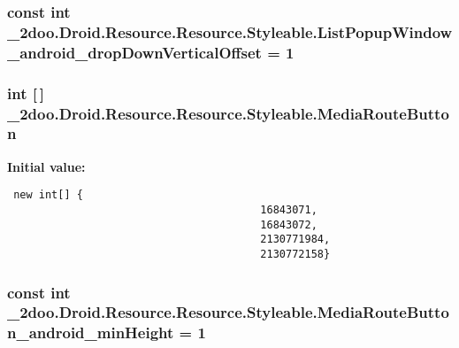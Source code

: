 \hypertarget{class__2doo_1_1_droid_1_1_resource_1_1_styleable_d4f5c7e5aed5b520770e5883af13782b}{
\subsubsection[{ListPopupWindow\_\-android\_\-dropDownVerticalOffset}]{\setlength{\rightskip}{0pt plus 5cm}const int \_\-2doo.Droid.Resource.Resource.Styleable.ListPopupWindow\_\-android\_\-dropDownVerticalOffset = 1}}
\label{class__2doo_1_1_droid_1_1_resource_1_1_styleable_d4f5c7e5aed5b520770e5883af13782b}


\hypertarget{class__2doo_1_1_droid_1_1_resource_1_1_styleable_1a1411bac962b968538047d470349c12}{
\subsubsection[{MediaRouteButton}]{\setlength{\rightskip}{0pt plus 5cm}int \mbox{[}$\,$\mbox{]} \_\-2doo.Droid.Resource.Resource.Styleable.MediaRouteButton}}
\label{class__2doo_1_1_droid_1_1_resource_1_1_styleable_1a1411bac962b968538047d470349c12}


\textbf{Initial value:}

\begin{Code}\begin{verbatim} new int[] {
                                        16843071,
                                        16843072,
                                        2130771984,
                                        2130772158}
\end{verbatim}
\end{Code}
\hypertarget{class__2doo_1_1_droid_1_1_resource_1_1_styleable_b09aeb7ef7634cccfdd60ae029408119}{
\subsubsection[{MediaRouteButton\_\-android\_\-minHeight}]{\setlength{\rightskip}{0pt plus 5cm}const int \_\-2doo.Droid.Resource.Resource.Styleable.MediaRouteButton\_\-android\_\-minHeight = 1}}
\label{class__2doo_1_1_droid_1_1_resource_1_1_styleable_b09aeb7ef7634cccfdd60ae029408119}


